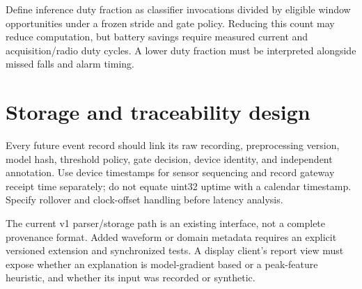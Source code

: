 Define inference duty fraction as classifier invocations divided by eligible window opportunities under a frozen stride and gate policy. Reducing this count may reduce computation, but battery savings require measured current and acquisition/radio duty cycles. A lower duty fraction must be interpreted alongside missed falls and alarm timing.

\section{Storage and traceability design}
Every future event record should link its raw recording, preprocessing version, model hash, threshold policy, gate decision, device identity, and independent annotation. Use device timestamps for sensor sequencing and record gateway receipt time separately; do not equate uint32 uptime with a calendar timestamp. Specify rollover and clock-offset handling before latency analysis.

The current v1 parser/storage path is an existing interface, not a complete provenance format. Added waveform or domain metadata requires an explicit versioned extension and synchronized tests. A display client's report view must expose whether an explanation is model-gradient based or a peak-feature heuristic, and whether its input was recorded or synthetic.
